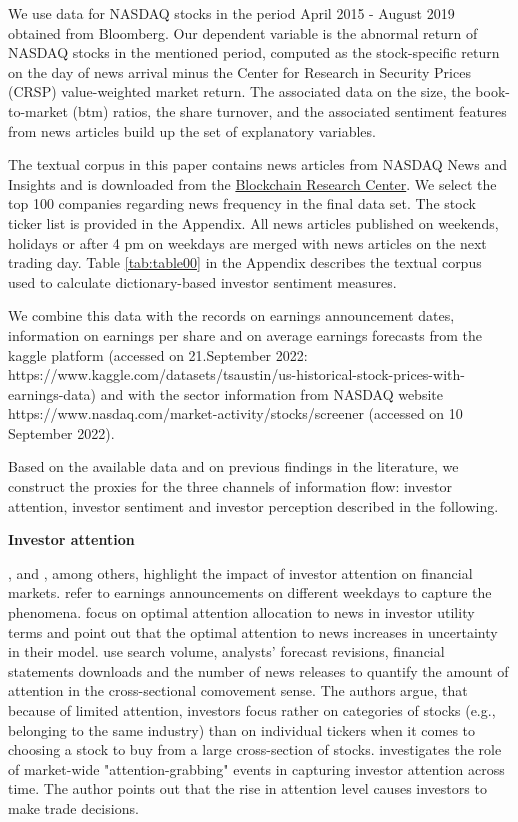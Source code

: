 \documentclass[11pt]{article}
\begin{document}
We use data for NASDAQ stocks in the period April 2015 - August 2019 obtained from Bloomberg.
Our dependent variable is the abnormal return of NASDAQ stocks in the mentioned period, computed as the stock-specific return on the day of news arrival minus the Center for Research in Security Prices (CRSP) value-weighted market return. The associated data on the size, the book-to-market (btm) ratios, the share turnover, and the associated sentiment features from news articles build up the set of explanatory variables.

The textual corpus in this paper contains news articles from NASDAQ News and Insights and is downloaded from the \href{https://blockchain-research-center.com/}{Blockchain Research Center}. We select the top 100 companies regarding news frequency in the final data set. The stock ticker list is provided in the Appendix. All news articles published on weekends, holidays or after 4 pm on weekdays are merged with news articles on the next trading day.
Table \ref{tab:table00} in the Appendix describes the textual corpus used to calculate dictionary-based investor sentiment measures.


We combine this data with the records on earnings announcement dates, information on earnings per share and on average earnings forecasts from the kaggle platform (accessed on
21.September 2022:
https://www.kaggle.com/datasets/tsaustin/us-historical-stock-prices-with-earnings-data) and with the sector information from NASDAQ website https://www.nasdaq.com/market-activity/stocks/screener (accessed on 10 September 2022).

Based on the available data and on previous findings in the literature, we construct the proxies for the three channels of information flow: investor attention, investor sentiment and investor perception described in the following.

\vspace{0.5cm}
{\bf {Investor attention}}

\cite{chen2022},  \cite{daniel2020} and \cite{dellavigna2009}, among others, highlight the impact of investor attention on financial markets. \cite{dellavigna2009} refer to earnings announcements on different weekdays to capture the phenomena. \cite{daniel2020} focus on optimal attention allocation to news in investor utility terms and point out that the optimal attention to news increases in uncertainty in their model. \cite{drake2017} use search volume, analysts' forecast revisions, financial statements downloads and the number of news releases to quantify the amount of attention in the cross-sectional comovement sense. The authors argue, that because of limited attention, investors focus rather on categories of stocks (e.g., belonging to the same industry) than on individual tickers when it comes to choosing a stock to buy from a large cross-section of stocks. \cite{YUAN2015} investigates the role of market-wide "attention-grabbing" events in capturing investor attention across time. The author points out that the rise in attention level causes investors to make trade decisions.
\end{document}
